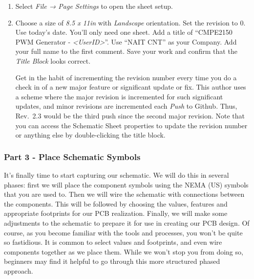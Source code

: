 \documentclass[
  letterpaper,
  DIV=11,
  numbers=noendperiod,
  oneside]{scrartcl}
\begin{document}
\begin{enumerate}
\def\labelenumi{\arabic{enumi}.}
\item
  Select \emph{File → Page Settings} to open the sheet setup.
\item
  Choose a size of \emph{8.5 x 11in} with \emph{Landscape} orientation.
  Set the revision to 0. Use today's date. You'll only need one sheet.
  Add a title of ``CMPE2150 PWM Generator -
  \emph{\textless UserID\textgreater{}}''.
  Use ``NAIT CNT'' as your Company. Add your full name to the first
  comment. Save your work and confirm that the \emph{Title Block} looks
  correct.

  \begin{tcolorbox}[enhanced jigsaw, arc=.35mm, opacitybacktitle=0.6, titlerule=0mm, title=\textcolor{quarto-callout-note-color}{\faInfo}\hspace{0.5em}{Note}, coltitle=black, colframe=quarto-callout-note-color-frame, rightrule=.15mm, colback=white, bottomtitle=1mm, toprule=.15mm, bottomrule=.15mm, colbacktitle=quarto-callout-note-color!10!white, leftrule=.75mm, breakable, left=2mm, opacityback=0, toptitle=1mm]

  Get in the habit of incrementing the revision number every time you do
  a check in of a new major feature or significant update or fix. This
  author uses a scheme where the major revision is incremented for such
  significant updates, and minor revisions are incremented each
  \emph{Push} to Github. Thus, Rev.~2.3 would be the third push since
  the second major revision. Note that you can access the Schematic
  Sheet properties to update the revision number or anything else by
  double-clicking the title block.

  \end{tcolorbox}
\end{enumerate}

\subsubsection{Part 3 - Place Schematic
Symbols}\label{part-3---place-schematic-symbols}

It's finally time to start capturing our schematic. We will do this in
several phases: first we will place the component symbols using the NEMA
(US) symbols that you are used to. Then we will wire the schematic with
connections between the components. This will be followed by choosing
the values, features and appropriate footprints for our PCB realization.
Finally, we will make some adjustments to the schematic to prepare it
for use in creating our PCB design. Of course, as you become familiar
with the tools and processes, you won't be quite so fastidious. It is
common to select values and footprints, and even wire components
together as we place them. While we won't stop you from doing so,
beginners may find it helpful to go through this more structured phased
approach.
\end{document}

